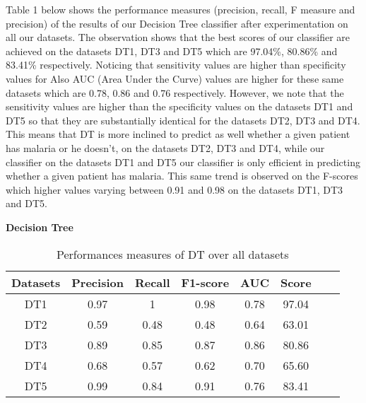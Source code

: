 \documentclass[10pt,a4paper]{article}
\begin{document}
Table 1  below shows the performance measures (precision, recall, F measure and precision) of the results of our Decision Tree classifier after experimentation on all our datasets. The observation shows that the best scores of our classifier are achieved on the datasets DT1, DT3 and DT5 which are 97.04\%, 80.86\% and 83.41\% respectively. Noticing that sensitivity values are higher than specificity values for Also AUC (Area Under the Curve) values are higher for these same datasets which are 0.78, 0.86 and 0.76 respectively. However, we note that the sensitivity values are higher than the specificity values on the datasets DT1 and DT5 so that they are substantially identical for the datasets DT2, DT3 and DT4. This means that DT is more inclined to predict as well whether a given patient has malaria or he doesn’t, on the datasets DT2, DT3 and DT4, while our classifier on the datasets DT1 and DT5 our classifier is only efficient in predicting whether a given patient has malaria. This same trend is observed on the F-scores which higher values varying between 0.91 and 0.98 on the datasets DT1, DT3 and DT5.
\begin{center}
\textbf{Decision Tree}
\end{center}

\begin{table}[!ht]
\centering
\begin{tabular}{*{6}{c}l r}
  \toprule
  \textbf{Datasets} & \textbf{Precision} & \textbf{Recall} & \textbf{F1-score}&\textbf{AUC} &\textbf{Score}\\
   \midrule
  DT1 &0.97 & 1  & 0.98& 0.78&97.04 \\
  DT2 & 0.59 &0.48&0.48&0.64&63.01 \\
  DT3 &0.89 &0.85 &0.87&0.86&80.86\\
  DT4 &0.68 &0.57&0.62&0.70&65.60\\
  DT5 &0.99 &0.84&0.91&0.76&83.41\\

  
    \bottomrule
\end{tabular}
\caption{Performances measures of DT over all datasets}\label{perf-measure-dt1}
\end{table}
\end{document}
